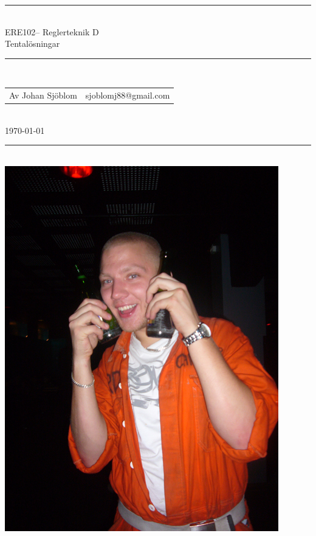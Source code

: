 \documentclass[a4paper]{article}
\newcommand{\coursecode}{ERE102}
\newcommand{\coursename}{Reglerteknik D}
\newcommand{\doctitle}{Tentalösningar}
\newcommand{\horrule}[1]{\rule{\linewidth}{#1}} %
\begin{document}
\thispagestyle{plain} %


\begin{center}
\horrule{2pt} \\[0.3cm] %
%
\huge  \coursecode -- \coursename \\[1mm]
\Large \doctitle
\normalsize %
\\[5mm]

\horrule{0.5pt}\\[5mm] %

\begin{tabular}{ l r }
  Av Johan Sjöblom & sjoblomj88@gmail.com
\end{tabular}\\[0.1cm]
\footnotesize \today\\[0.4cm]

\end{center}
\horrule{2pt} %
\normalsize %
\\[2.5cm]

\resizebox{!}{120mm}
{\includegraphics{p1110461.jpg}}
\end{document}
